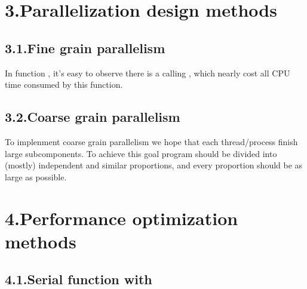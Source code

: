 \documentclass{article}
\begin{document}
\section{3.\hspace*{0.5em}Parallelization design methods}\label{sec-parallelization-design-methods}%

\subsection{3.1.\hspace*{0.5em}Fine grain parallelism}\label{sec-fine-grain-parallelism}%

\noindent{}In function , it's easy to observe there is a  calling , which nearly cost all CPU time consumed by this function.%

\subsection{3.2.\hspace*{0.5em}Coarse grain parallelism}\label{sec-coarse-grain-parallelism}%

\noindent{}To implenment coarse grain parallelism we hope that each thread/process finish large subcomponents. To achieve this goal  program should be divided into (mostly) independent and similar proportions, and every proportion should be as large as possible.%

\section{4.\hspace*{0.5em}Performance optimization methods}\label{sec-performance-optimization-methods}%

\subsection{4.1.\hspace*{0.5em}Serial  function with }\label{sec-serial-mkl-function-with-openmp}%
\end{document}

